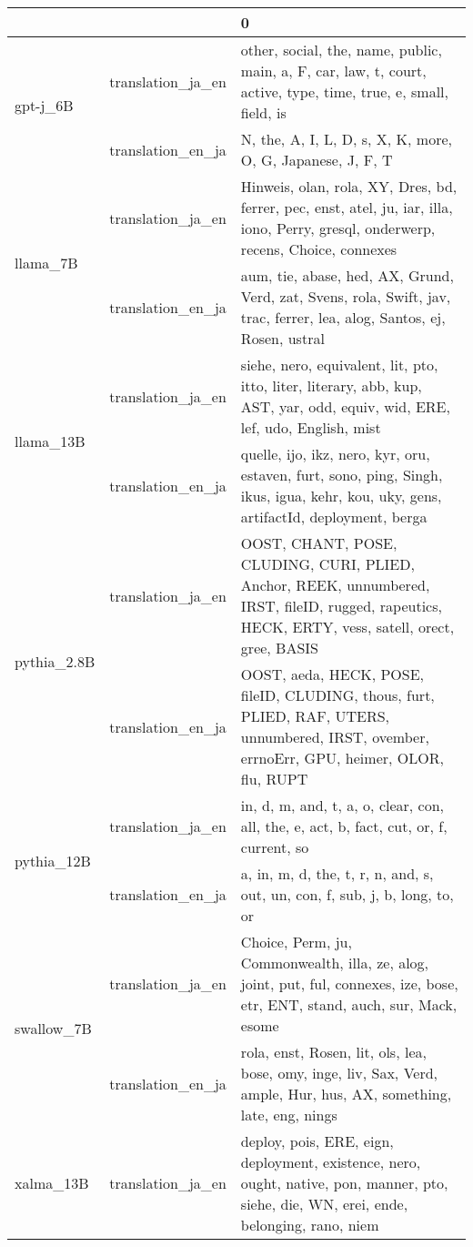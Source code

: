 \begin{tabular}{lll}
\toprule
 &  & 0 \\
\midrule
\multirow[t]{2}{*}{gpt-j_6B} & translation_ja_en & other, social, the, name, public, main, a, F, car, law, t, court, active, type, time, true, e, small, field, is \\
 & translation_en_ja & N, the, A, I, L, D, s, X, K, more, O, G, Japanese, J, F, T \\
\cline{1-3}
\multirow[t]{2}{*}{llama_7B} & translation_ja_en & Hinweis, olan, rola, XY, Dres, bd, ferrer, pec, enst, atel, ju, iar, illa, iono, Perry, gresql, onderwerp, recens, Choice, connexes \\
 & translation_en_ja & aum, tie, abase, hed, AX, Grund, Verd, zat, Svens, rola, Swift, jav, trac, ferrer, lea, alog, Santos, ej, Rosen, ustral \\
\cline{1-3}
\multirow[t]{2}{*}{llama_13B} & translation_ja_en & siehe, nero, equivalent, lit, pto, itto, liter, literary, abb, kup, AST, yar, odd, equiv, wid, ERE, lef, udo, English, mist \\
 & translation_en_ja & quelle, ijo, ikz, nero, kyr, oru, estaven, furt, sono, ping, Singh, ikus, igua, kehr, kou, uky, gens, artifactId, deployment, berga \\
\cline{1-3}
\multirow[t]{2}{*}{pythia_2.8B} & translation_ja_en & OOST, CHANT, POSE, CLUDING, CURI, PLIED, Anchor, REEK, unnumbered, IRST, fileID, rugged, rapeutics, HECK, ERTY, vess, satell, orect, gree, BASIS \\
 & translation_en_ja & OOST, aeda, HECK, POSE, fileID, CLUDING, thous, furt, PLIED, RAF, UTERS, unnumbered, IRST, ovember, errnoErr, GPU, heimer, OLOR, flu, RUPT \\
\cline{1-3}
\multirow[t]{2}{*}{pythia_12B} & translation_ja_en & in, d, m, and, t, a, o, clear, con, all, the, e, act, b, fact, cut, or, f, current, so \\
 & translation_en_ja & a, in, m, d, the, t, r, n, and, s, out, un, con, f, sub, j, b, long, to, or \\
\cline{1-3}
\multirow[t]{2}{*}{swallow_7B} & translation_ja_en & Choice, Perm, ju, Commonwealth, illa, ze, alog, joint, put, ful, connexes, ize, bose, etr, ENT, stand, auch, sur, Mack, esome \\
 & translation_en_ja & rola, enst, Rosen, lit, ols, lea, bose, omy, inge, liv, Sax, Verd, ample, Hur, hus, AX, something, late, eng, nings \\
\cline{1-3}
\multirow[t]{2}{*}{xalma_13B} & translation_ja_en & deploy, pois, ERE, eign, deployment, existence, nero, ought, native, pon, manner, pto, siehe, die, WN, erei, ende, belonging, rano, niem \\

\end{tabular}
